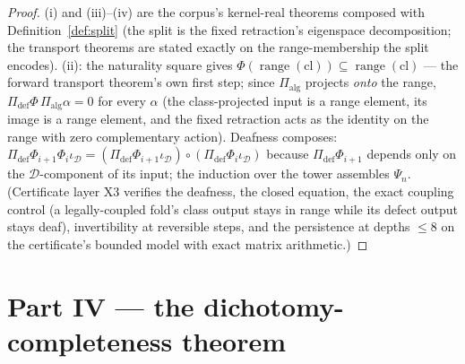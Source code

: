\documentclass[11pt]{article}
\begin{document}
\begin{proof}
(i) and (iii)--(iv) are the corpus's kernel-real theorems composed with Definition~\ref{def:split} (the split is the fixed retraction's eigenspace decomposition; the transport theorems are stated exactly on the range-membership the split encodes). (ii): the naturality square gives $\Phi(\operatorname{range}(\mathrm{cl}))\subseteq\operatorname{range}(\mathrm{cl})$ — the forward transport theorem's own first step; since $\Pi_{\mathrm{alg}}$ projects \emph{onto} the range, $\Pi_{\mathrm{def}}\Phi\,\Pi_{\mathrm{alg}}\alpha=0$ for every $\alpha$ (the class-projected input is a range element, its image is a range element, and the fixed retraction acts as the identity on the range with zero complementary action). Deafness composes: $\Pi_{\mathrm{def}}\Phi_{i+1}\Phi_i\iota_{\mathcal{D}}=(\Pi_{\mathrm{def}}\Phi_{i+1}\iota_{\mathcal{D}})\circ(\Pi_{\mathrm{def}}\Phi_i\iota_{\mathcal{D}})$ because $\Pi_{\mathrm{def}}\Phi_{i+1}$ depends only on the $\mathcal{D}$-component of its input; the induction over the tower assembles $\Psi_n$. (Certificate layer X3 verifies the deafness, the closed equation, the exact coupling control (a legally-coupled fold's class output stays in range while its defect output stays deaf), invertibility at reversible steps, and the persistence at depths $\le 8$ on the certificate's bounded model with exact matrix arithmetic.)
\end{proof}

\section{Part IV — the dichotomy-completeness theorem}
\end{document}
